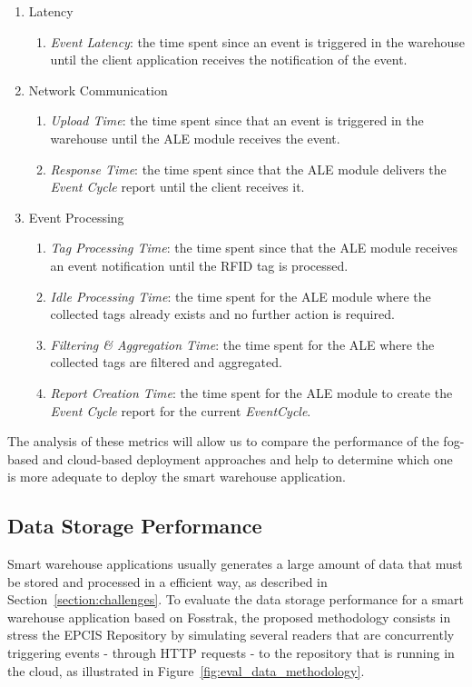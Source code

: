 \begin{enumerate}
  \item Latency
  \begin{enumerate}
    \item \textit{Event Latency}: the time spent since an event is triggered in the warehouse until
    the client application receives the notification of the event.
  \end{enumerate}
  \item Network Communication
  \begin{enumerate}
    \item \textit{Upload Time}: the time spent since that an event is triggered in the warehouse until
    the \gls{ALE} module receives the event.
    \item \textit{Response Time}: the time spent since that the \gls{ALE} module delivers the
    \textit{Event Cycle} report until the client receives it.
  \end{enumerate}
  \item Event Processing
  \begin{enumerate}
    \item \textit{Tag Processing Time}: the time spent since that the \gls{ALE} module receives an event
    notification until the \gls{RFID} tag is processed.
    \item \textit{Idle Processing Time}: the time spent for the \gls{ALE} module where the collected
    tags already exists and no further action is required.
    \item \textit{Filtering \& Aggregation Time}: the time spent for the \gls{ALE} where the
    collected tags are filtered and aggregated.
    \item \textit{Report Creation Time}: the time spent for the \gls{ALE} module to create the
    \textit{Event Cycle} report for the current \textit{EventCycle}.
  \end{enumerate}
\end{enumerate}

The analysis of these metrics will allow us to compare the performance of the fog-based and cloud-based
deployment approaches and help to determine which one is more adequate to deploy
the smart warehouse application.

\subsection{Data Storage Performance}
\label{sub:eval_methodology_data}
Smart warehouse applications usually generates a large amount of data that must be stored and processed in
a efficient way, as described in Section~\ref{section:challenges}. To evaluate the data storage
performance for a smart warehouse application based on Fosstrak, the proposed methodology consists in
stress the \gls{EPCIS} Repository by simulating several readers that are concurrently triggering events -
through \gls{HTTP} requests - to the repository that is running in the cloud, as illustrated in Figure~\ref{fig:eval_data_methodology}.

